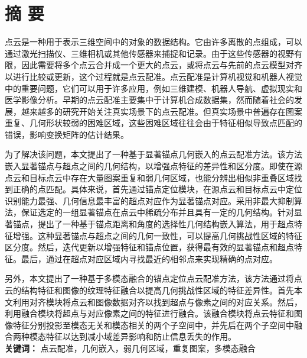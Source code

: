 


\chapter{摘 \quad 要}
\xiaosi
点云是一种用于表示三维空间中的对象的数据结构。它由许多离散的点组成，可以通过激光扫描仪、三维相机或其他传感器来捕捉和记录。由于这些传感器的视野有限，因此需要将多个点云合并成一个更大的点云，或将点云与先前的点云模型对齐以进行比较或更新，这个过程就是点云配准。点云配准是计算机视觉和机器人视觉中的重要问题，它们可以用于许多应用，例如三维建模、机器人导航、虚拟现实和医学影像分析。早期的点云配准主要集中于计算机合成数据集，然而随着社会的发展，越来越多的研究开始关注真实场景下的点云配准。但真实场景中普遍存在图案重复、几何形状较弱的困难区域，这些困难区域往往会由于特征相似导致点匹配的错误，影响变换矩阵的估计结果。

为了解决该问题，本文提出了一种基于显著锚点几何嵌入的点云配准方法。该方法嵌入显著锚点与超点之间的几何结构，以增强点特征的差异性和区分度。即使在源点云和目标点云中存在大量图案重复和弱几何区域，也能分辨出相似非重叠区域找到正确的点匹配。具体来说，首先通过锚点定位模块，在源点云和目标点云中定位识别能力最强、几何信息最丰富的超点对应作为显著锚点对应。采用非最大抑制算法，保证选定的一组显著锚点在点云中稀疏分布并且具有一定的几何结构。针对显著锚点，提出了一种基于锚点距离和角度的选择性几何结构嵌入算法，用于超点特征增强。这种显著锚点与超点之间的几何一致性，可以提高几何挑战性区域的特征区分度。然后，迭代更新以增强特征和锚点位置，获得最有效的显著锚点和超点特征。最后，通过在超点对应区域内寻找最近的相邻点来实现精确的点对应。

另外，本文提出了一种基于多模态融合的锚点定位点云配准方法，该方法通过将点云的结构特征和图像的纹理特征融合以提高几何挑战性区域的特征差异性。首先本文利用对齐模块将点云和图像数据对齐以找到超点与像素之间的对应关系。然后，利用融合模块将超点与对应像素之间的特征进行融合。该融合模块将点云特征和图像特征分别投影至模态无关和模态相关的两个子空间中，并先后在两个子空间中融合两种模态特征以达到减小域差异影响和防止信息丢失的作用。\\

\noindent\songti\textbf{关键词：} 点云配准，几何嵌入，弱几何区域，重复图案，多模态融合

\clearpage